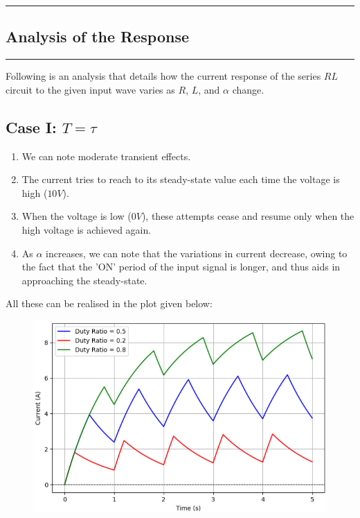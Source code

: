 \newpage
{\color{gray}\hrule}
\begin{center}
\section{Analysis of the Response}
\bigskip
\end{center}
{\color{gray}\hrule}
\begin{multicols}{2}

Following is an analysis that details how the current response of the series $RL$ circuit to the given input wave varies as $R$, $L$, and $\alpha$ change.

\subsection{Case I: $T=\tau$}
\begin{enumerate}
    \item We can note moderate transient effects.
    \item The current tries to reach to its steady-state value each time the voltage is high ($10V$).
    \item When the voltage is low ($0V$), these attempts cease and resume only when the high voltage is achieved again.
    \item As $\alpha$ increases, we can note that the variations in current decrease, owing to the fact that the 'ON' period of the input signal is longer, and thus aids in approaching the steady-state.
\end{enumerate}
All these can be realised in the plot given below: \\
\begin{figure}[H]
  \centering
  \includegraphics[width=\columnwidth]{sections/6_case1.png}

\end{figure}
\end{multicols}

